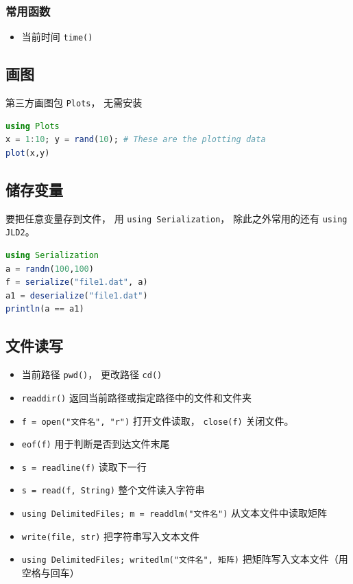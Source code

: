 \subsubsection{常用函数}
\begin{itemize}
\item 当前时间 \verb`time()`
\end{itemize}



\subsection{画图}
第三方画图包 \verb`Plots`， 无需安装
\begin{lstlisting}[language=Julia]
using Plots
x = 1:10; y = rand(10); # These are the plotting data
plot(x,y)
\end{lstlisting}


\subsection{储存变量}
要把任意变量存到文件， 用 \verb`using Serialization`， 除此之外常用的还有 \verb`using JLD2`。
\begin{lstlisting}[language=julia]
using Serialization
a = randn(100,100)
f = serialize("file1.dat", a)
a1 = deserialize("file1.dat")
println(a == a1)
\end{lstlisting}

\subsection{文件读写}
\begin{itemize}
\item 当前路径 \verb`pwd()`， 更改路径 \verb`cd()`
\item \verb`readdir()` 返回当前路径或指定路径中的文件和文件夹
\item \verb`f = open("文件名", "r")` 打开文件读取， \verb`close(f)` 关闭文件。
\item \verb`eof(f)` 用于判断是否到达文件末尾
\item \verb`s = readline(f)` 读取下一行
\item \verb`s = read(f, String)` 整个文件读入字符串
\item \verb`using DelimitedFiles; m = readdlm("文件名")` 从文本文件中读取矩阵
\item \verb`write(file, str)` 把字符串写入文本文件
\item \verb`using DelimitedFiles; writedlm("文件名", 矩阵)` 把矩阵写入文本文件（用空格与回车）
\end{itemize}


